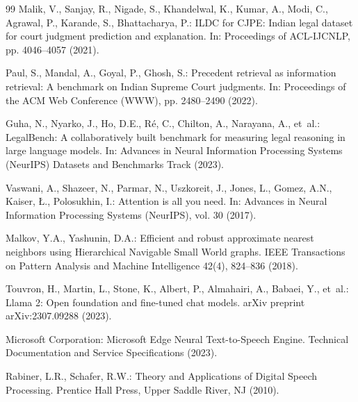 \documentclass{llncs}
\begin{document}
\begin{thebibliography}{99}
Malik, V., Sanjay, R., Nigade, S., Khandelwal, K., Kumar, A., Modi, C., Agrawal, P., Karande, S., Bhattacharya, P.: ILDC for CJPE: Indian legal dataset for court judgment prediction and explanation. In: Proceedings of ACL-IJCNLP, pp. 4046--4057 (2021).

Paul, S., Mandal, A., Goyal, P., Ghosh, S.: Precedent retrieval as information retrieval: A benchmark on Indian Supreme Court judgments. In: Proceedings of the ACM Web Conference (WWW), pp. 2480--2490 (2022).

Guha, N., Nyarko, J., Ho, D.E., R{\'e}, C., Chilton, A., Narayana, A., et~al.: LegalBench: A collaboratively built benchmark for measuring legal reasoning in large language models. In: Advances in Neural Information Processing Systems (NeurIPS) Datasets and Benchmarks Track (2023).

Vaswani, A., Shazeer, N., Parmar, N., Uszkoreit, J., Jones, L., Gomez, A.N., Kaiser, {\L}., Polosukhin, I.: Attention is all you need. In: Advances in Neural Information Processing Systems (NeurIPS), vol. 30 (2017).

Malkov, Y.A., Yashunin, D.A.: Efficient and robust approximate nearest neighbors using Hierarchical Navigable Small World graphs. IEEE Transactions on Pattern Analysis and Machine Intelligence 42(4), 824--836 (2018).

Touvron, H., Martin, L., Stone, K., Albert, P., Almahairi, A., Babaei, Y., et~al.: Llama 2: Open foundation and fine-tuned chat models. arXiv preprint arXiv:2307.09288 (2023).

Microsoft Corporation: Microsoft Edge Neural Text-to-Speech Engine. Technical Documentation and Service Specifications (2023).

Rabiner, L.R., Schafer, R.W.: Theory and Applications of Digital Speech Processing. Prentice Hall Press, Upper Saddle River, NJ (2010).

\end{thebibliography}
\end{document}
